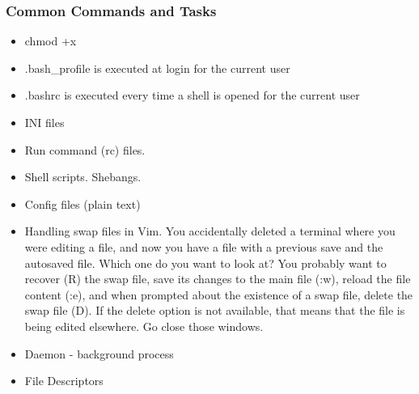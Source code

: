 \subsubsection{Common Commands and Tasks}








\begin{itemize}
	\item chmod +x
	\item .bash\_profile is executed at login for the current user
	\item .bashrc is executed every time a shell is opened for the current user
	\item INI files
	\item Run command (rc) files.
	\item Shell scripts. Shebangs.
	\item Config files (plain text)
	\item Handling swap files in Vim. You accidentally deleted a terminal where you were editing a file, and now you have a file with a previous save and the autosaved file. Which one do you want to look at? You probably want to recover (R) the swap file, save its changes to the main file (:w), reload the file content (:e), and when prompted about the existence of a swap file, delete the swap file (D). If the delete option is not available, that means that the file is being edited elsewhere. Go close those windows.
	\item Daemon - background process
	\item File Descriptors
\end{itemize}

